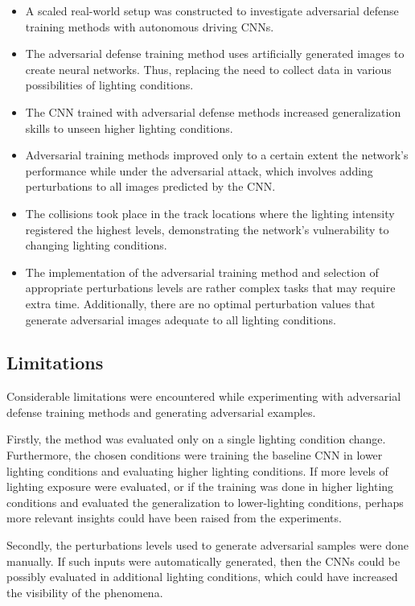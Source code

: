 \documentclass[12pt]{article}
\begin{document}
\begin{itemize}
   \item A scaled real-world setup was constructed to investigate adversarial defense training methods with autonomous driving CNNs. 
   \item The adversarial defense training method uses artificially generated images to create neural networks. Thus, replacing the need to collect data in various possibilities of lighting conditions.
   \item The CNN trained with adversarial defense methods increased generalization skills to unseen higher lighting conditions. 
   \item Adversarial training methods improved only to a certain extent the network's performance while under the adversarial attack, which involves adding perturbations to all images predicted by the CNN.
   \item The collisions took place in the track locations where the lighting intensity registered the highest levels, demonstrating the network's vulnerability to changing lighting conditions.
   \item The implementation of the adversarial training method and selection of appropriate perturbations levels are rather complex tasks that may require extra time. Additionally, there are no optimal perturbation values that generate adversarial images adequate to all lighting conditions. 
\end{itemize}

\subsection{Limitations}

Considerable limitations were encountered while experimenting with adversarial defense training methods and generating adversarial examples. 

Firstly, the method was evaluated only on a single lighting condition change. Furthermore, the chosen conditions were training the baseline CNN in lower lighting conditions and evaluating higher lighting conditions. If more levels of lighting exposure were evaluated, or if the training was done in higher lighting conditions and evaluated the generalization to lower-lighting conditions, perhaps more relevant insights could have been raised from the experiments. 

Secondly, the perturbations levels used to generate adversarial samples were done manually. If such inputs were automatically generated, then the CNNs could be possibly evaluated in additional lighting conditions, which could have increased the visibility of the phenomena.
\end{document}
